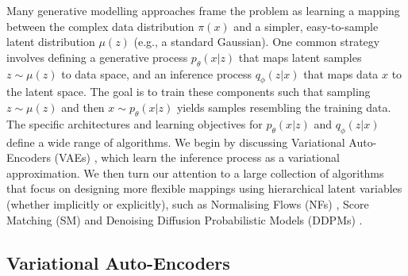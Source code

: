 Many generative modelling approaches frame the problem as learning a mapping between the complex data distribution $\pi(x)$ and a simpler, easy-to-sample latent distribution $\mu(z)$ (e.g., a standard Gaussian). One common strategy involves defining a generative process $p_\theta(x|z)$ that maps latent samples $z \sim \mu(z)$ to data space, and an inference process $q_\phi(z|x)$ that maps data $x$ to the latent space. The goal is to train these components such that sampling $z \sim \mu(z)$ and then $x \sim p_\theta(x|z)$ yields samples resembling the training data. The specific architectures and learning objectives for $p_\theta(x|z)$ and $q_\phi(z|x)$ define a wide range of algorithms. We begin by discussing Variational Auto-Encoders (VAEs) \parencite{kingma2019introduction}, which learn the inference process as a variational approximation. We then turn our attention to a large collection of algorithms that focus on designing more flexible mappings using hierarchical latent variables (whether implicitly or explicitly), such as Normalising Flows (NFs) \parencite{papamakarios2021normalizing}, Score Matching (SM) \parencite{song2019generative,song2020score} and Denoising Diffusion Probabilistic Models (DDPMs) \parencite{ho2020denoising}. \label{ntn:discrete_mappings}

\subsection{Variational Auto-Encoders}


